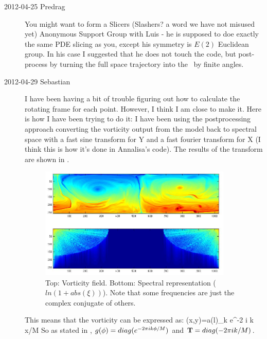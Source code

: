 \begin{description}
\item[2012-04-25 Predrag] You might want to form a Slicers (Slashers? a
word we have not misused yet) Anonymous Support Group with Luis - he is
supposed to doe exactly the same PDE slicing as you, except his symmetry
is $E(2)$ Euclidean group. In his case I suggested that he does not touch
the code, but post-process by turning the full space trajectory into the
\slice\ by finite angles.

\item[2012-04-29 Sebastian]
I have been having a bit of trouble figuring out how to calculate the
rotating frame for each point. However, I think I am close to make it.
Here is how I have been trying to do it: I have been using the
postprocessing approach converting the vorticity output from the model
back to spectral space with a fast sine transform for Y and a fast
fourier transform for X (I think this is how it's done in Annalisa's
code). The results of the transform are shown in .

    \begin{figure}[t]
    \begin{center}
    \includegraphics[width=0.9\textwidth, clip=true]{fouriervort}
    \end{center}
    \caption{Top: Vorticity field. Bottom: Spectral representation
    ($ln(1+abs(\xi))$). Note that some frequencies are just the complex
    conjugate of others.}
    \label{f:fouriervort}
    \end{figure}

This means that the vorticity can be expressed as:
    \beq
    \xi(x,y)=\sum a(l)_{k} e^{-2 i \pi k x/M}
So as stated in , $g({\bf \phi})=diag(e^{-2 \pi i k {\bf \phi} /M})$
and $\mathbf{T}=diag(-2 \pi i k/M)$.


\end{description}
